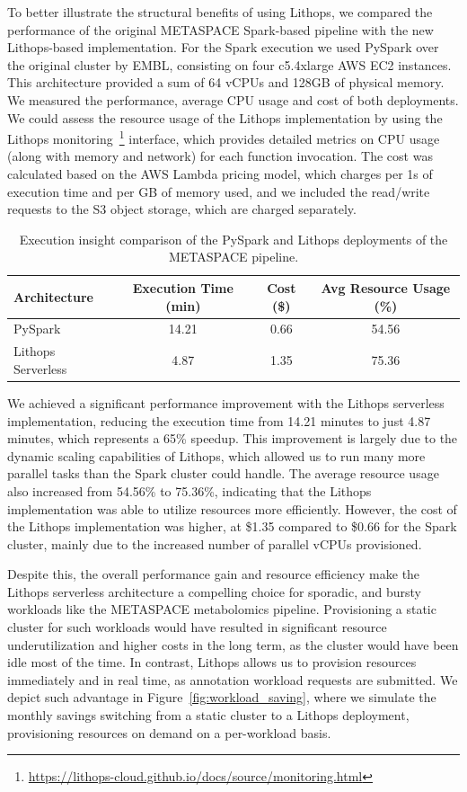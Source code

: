 To better illustrate the structural benefits of using Lithops, we compared the performance of the original METASPACE Spark-based pipeline with the new Lithops-based implementation. For the Spark execution we used PySpark over the original cluster by EMBL, consisting on four c5.4xlarge AWS EC2 instances. This architecture provided a sum of 64 vCPUs and 128GB of physical memory. We measured the performance, average CPU usage and cost of both deployments. We could assess the resource usage of the Lithops implementation by using the Lithops monitoring~\footnote{\url{https://lithops-cloud.github.io/docs/source/monitoring.html}} interface, which provides detailed metrics on CPU usage (along with memory and network) for each function invocation. The cost was calculated based on the AWS Lambda pricing model, which charges per 1s of execution time and per GB of memory used, and we included the read/write requests to the S3 object storage, which are charged separately.


\begin{table}[htbp]
\centering
\begin{tabular}{|l|c|c|c|}
\hline
\textbf{Architecture} & \textbf{Execution Time (min)} & \textbf{Cost (\$)} & \textbf{Avg Resource Usage (\%)} \\
\hline
PySpark & 14.21 & 0.66 & 54.56 \\
Lithops Serverless & 4.87 & 1.35 & 75.36 \\
\hline
\end{tabular}
\caption{Execution insight comparison of the PySpark and Lithops deployments of the METASPACE pipeline.}
\label{tab:arch_comparison}
\end{table}

We achieved a significant performance improvement with the Lithops serverless implementation, reducing the execution time from 14.21 minutes to just 4.87 minutes, which represents a 65\% speedup. This improvement is largely due to the dynamic scaling capabilities of Lithops, which allowed us to run many more parallel tasks than the Spark cluster could handle. The average resource usage also increased from 54.56\% to 75.36\%, indicating that the Lithops implementation was able to utilize resources more efficiently. However, the cost of the Lithops implementation was higher, at \$1.35 compared to \$0.66 for the Spark cluster, mainly due to the increased number of parallel vCPUs provisioned.

Despite this, the overall performance gain and resource efficiency make the Lithops serverless architecture a compelling choice for sporadic, and bursty workloads like the METASPACE metabolomics pipeline. Provisioning a static cluster for such workloads would have resulted in significant resource underutilization and higher costs in the long term, as the cluster would have been idle most of the time. In contrast, Lithops allows us to provision resources immediately and in real time, as annotation workload requests are submitted. We depict such advantage in Figure~\ref{fig:workload_saving}, where we simulate the monthly savings switching from a static cluster to a Lithops deployment, provisioning resources on demand on a per-workload basis.


